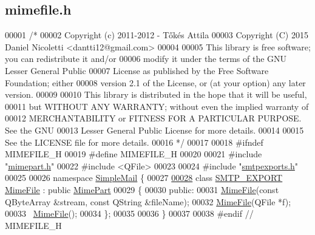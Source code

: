 \hypertarget{mimefile_8h_source}{}\subsection{mimefile.\+h}
\label{mimefile_8h_source}

\begin{DoxyCode}
00001 \textcolor{comment}{/*}
00002 \textcolor{comment}{  Copyright (c) 2011-2012 - Tőkés Attila}
00003 \textcolor{comment}{  Copyright (C) 2015 Daniel Nicoletti <dantti12@gmail.com>}
00004 \textcolor{comment}{}
00005 \textcolor{comment}{  This library is free software; you can redistribute it and/or}
00006 \textcolor{comment}{  modify it under the terms of the GNU Lesser General Public}
00007 \textcolor{comment}{  License as published by the Free Software Foundation; either}
00008 \textcolor{comment}{  version 2.1 of the License, or (at your option) any later version.}
00009 \textcolor{comment}{}
00010 \textcolor{comment}{  This library is distributed in the hope that it will be useful,}
00011 \textcolor{comment}{  but WITHOUT ANY WARRANTY; without even the implied warranty of}
00012 \textcolor{comment}{  MERCHANTABILITY or FITNESS FOR A PARTICULAR PURPOSE.  See the GNU}
00013 \textcolor{comment}{  Lesser General Public License for more details.}
00014 \textcolor{comment}{}
00015 \textcolor{comment}{  See the LICENSE file for more details.}
00016 \textcolor{comment}{*/}
00017 
00018 \textcolor{preprocessor}{#ifndef MIMEFILE\_H}
00019 \textcolor{preprocessor}{#define MIMEFILE\_H}
00020 
00021 \textcolor{preprocessor}{#include "\hyperlink{mimepart_8h}{mimepart.h}"}
00022 \textcolor{preprocessor}{#include <QFile>}
00023 
00024 \textcolor{preprocessor}{#include "\hyperlink{smtpexports_8h}{smtpexports.h}"}
00025 
00026 \textcolor{keyword}{namespace }\hyperlink{namespace_simple_mail}{SimpleMail} \{
00027 
\hyperlink{class_simple_mail_1_1_mime_file}{00028} \textcolor{keyword}{class }\hyperlink{smtpexports_8h_ac580c9660cb24a34b13807f4eb0e1bd0}{SMTP\_EXPORT} \hyperlink{class_simple_mail_1_1_mime_file}{MimeFile} : \textcolor{keyword}{public} \hyperlink{class_simple_mail_1_1_mime_part}{MimePart}
00029 \{
00030 \textcolor{keyword}{public}:
00031     \hyperlink{class_simple_mail_1_1_mime_file}{MimeFile}(\textcolor{keyword}{const} QByteArray &stream, \textcolor{keyword}{const} QString &fileName);
00032     \hyperlink{class_simple_mail_1_1_mime_file}{MimeFile}(QFile *f);
00033     ~\hyperlink{class_simple_mail_1_1_mime_file}{MimeFile}();
00034 \};
00035 
00036 \}
00037 
00038 \textcolor{preprocessor}{#endif // MIMEFILE\_H}
\end{DoxyCode}
